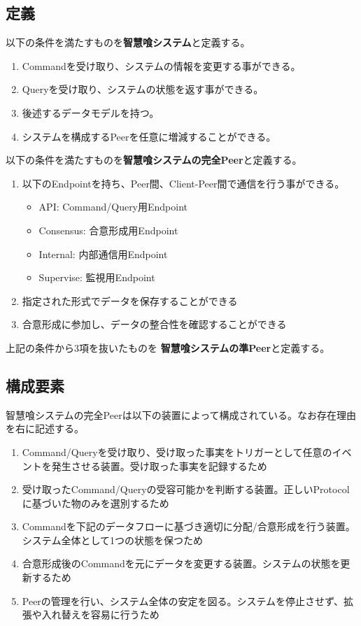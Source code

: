 \documentclass[10pt,a4paper]{jarticle}
\begin{document}
\begin{multicols}{2}
\subsection{定義}
以下の条件を満たすものを{\bf 智慧喰システム}と定義する。
\begin{enumerate}
  \item Commandを受け取り、システムの情報を変更する事ができる。
  \item Queryを受け取り、システムの状態を返す事ができる。
  \item 後述するデータモデルを持つ。
  \item システムを構成するPeerを任意に増減することができる。
\end{enumerate}
以下の条件を満たすものを{\bf 智慧喰システムの完全Peer}と定義する。
\begin{enumerate}
  \item 以下のEndpointを持ち、Peer間、Client-Peer間で通信を行う事ができる。
    \begin{itemize}
      \item API: Command/Query用Endpoint
      \item Consensus: 合意形成用Endpoint
      \item Internal: 内部通信用Endpoint
      \item Supervise: 監視用Endpoint
    \end{itemize}
  \item 指定された形式でデータを保存することができる
  \item 合意形成に参加し、データの整合性を確認することができる
\end{enumerate}
上記の条件から3項を抜いたものを {\bf 智慧喰システムの準Peer}と定義する。

\subsection{構成要素}
智慧喰システムの完全Peerは以下の装置によって構成されている。なお存在理由を右に記述する。
\begin{enumerate}
  \item Command/Queryを受け取り、受け取った事実をトリガーとして任意のイベントを発生させる装置。受け取った事実を記録するため
  \item 受け取ったCommand/Queryの受容可能かを判断する装置。正しいProtocolに基づいた物のみを選別するため
  \item Commandを下記のデータフローに基づき適切に分配/合意形成を行う装置。システム全体として1つの状態を保つため
  \item 合意形成後のCommandを元にデータを変更する装置。システムの状態を更新するため
  \item Peerの管理を行い、システム全体の安定を図る。システムを停止させず、拡張や入れ替えを容易に行うため  
\end{enumerate}


\end{multicols}
\end{document}
